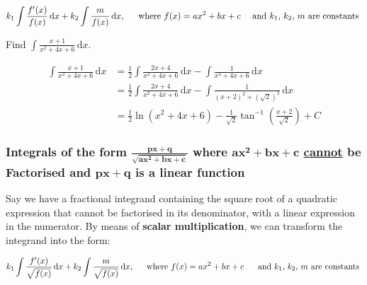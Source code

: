 \documentclass[11pt,a4paper]{book}
\begin{document}
\[
k_{1}\int\frac{f'(x)}{f(x)}\, \mathrm{d}x+k_{2}\int\frac{m}{f(x)}\, \mathrm{d}x\text{, \quad\ where \ensuremath{f(x)=ax^{2}+bx+c} \quad and \ensuremath{k_{1}}, \ensuremath{k_{2}}, \ensuremath{m} are constants }
\]


\begin{example}

Find ${\displaystyle \int\frac{x+1}{x^{2}+4x+6}\, \mathrm{d}x}$.

\medskip

\Solution

\begin{align*}
{\displaystyle \int\frac{x+1}{x^{2}+4x+6}\, \mathrm{d}x} & =\frac{1}{2}\int\frac{2x+4}{x^{2}+4x+6}\, \mathrm{d}x-\int\frac{1}{x^{2}+4x+6}\, \mathrm{d}x\\
 & =\frac{1}{2}\int\frac{2x+4}{x^{2}+4x+6}\, \mathrm{d}x-\int\frac{1}{(x+2)^{2}+\left(\sqrt{2}\right)^{2}}\, \mathrm{d}x\\
 & =\frac{1}{2}\ln\left(x^{2}+4x+6\right)-\frac{1}{\sqrt{2}}\tan^{-1}\left(\frac{x+2}{\sqrt{2}}\right)+C
\end{align*}

\end{example}

\subsubsection{Integrals of the form $\boldsymbol{\frac{px+q}{\sqrt{ax^{2}+bx+c}}}$
where $\boldsymbol{ax^{2}+bx+c}$ \uline{cannot} be Factorised
and $\boldsymbol{px+q}$ is a linear function}

Say we have a fractional integrand containing the square root of a
quadratic expression that cannot be factorised in its denominator,
with a linear expression in the numerator. By means of\textbf{ scalar
multiplication}, we can transform the integrand into the form:

\[
k_{1}\int\frac{f'(x)}{\sqrt{f(x)}}\, \mathrm{d}x+k_{2}\int\frac{m}{\sqrt{f(x)}}\, \mathrm{d}x\text{, \quad\ where \ensuremath{f(x)=ax^{2}+bx+c} \quad\ and \ensuremath{k_{1}}, \ensuremath{k_{2}}, \ensuremath{m} are constants }
\]
\end{document}
